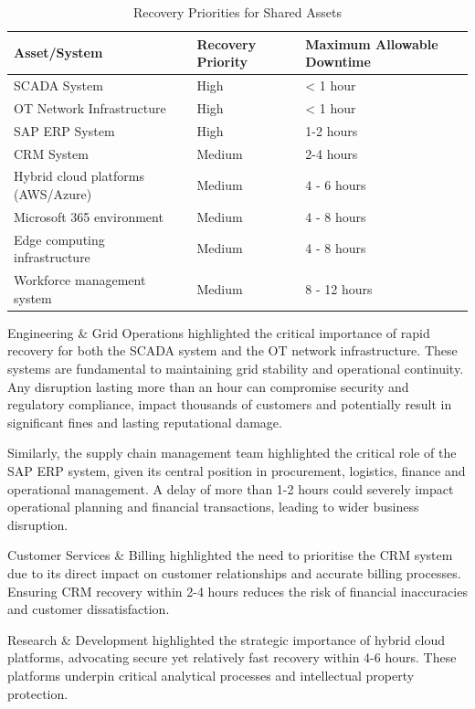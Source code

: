 \begin{table}[H]
    \centering
    \begin{tabular}{|p{7cm}|p{4cm}|p{4cm}|}
    \hline
    \textbf{Asset/System} & \textbf{Recovery Priority} & \textbf{Maximum Allowable Downtime} \\ \hline
    \ac{SCADA} System & High & < 1 hour \\ \hline
    \ac{OT} Network Infrastructure & High & < 1 hour \\ \hline
    \ac{SAP} \ac{ERP} System & High & 1-2 hours \\ \hline
    \ac{CRM} System & Medium & 2-4 hours \\ \hline
    Hybrid cloud platforms (AWS/Azure) & Medium & 4 - 6 hours \\ \hline
    Microsoft 365 environment & Medium & 4 - 8 hours \\ \hline
    Edge computing infrastructure & Medium & 4 - 8 hours \\ \hline
    Workforce management system & Medium & 8 - 12 hours \\ \hline
    \end{tabular}
    \caption{Recovery Priorities for Shared Assets}
    \label{tab:recovery_priorities_shared_assets}
    \end{table}

Engineering \& Grid Operations highlighted the critical importance of rapid recovery for both the \ac{SCADA} system and the \ac{OT} network infrastructure. These systems are fundamental to maintaining grid stability and operational continuity. Any disruption lasting more than an hour can compromise security and regulatory compliance, impact thousands of customers and potentially result in significant fines and lasting reputational damage.

Similarly, the supply chain management team highlighted the critical role of the \ac{SAP} \ac{ERP} system, given its central position in procurement, logistics, finance and operational management. A delay of more than 1-2 hours could severely impact operational planning and financial transactions, leading to wider business disruption.

Customer Services \& Billing highlighted the need to prioritise the \ac{CRM} system due to its direct impact on customer relationships and accurate billing processes. Ensuring \ac{CRM} recovery within 2-4 hours reduces the risk of financial inaccuracies and customer dissatisfaction.

Research \& Development highlighted the strategic importance of hybrid cloud platforms, advocating secure yet relatively fast recovery within 4-6 hours. These platforms underpin critical analytical processes and intellectual property protection.

